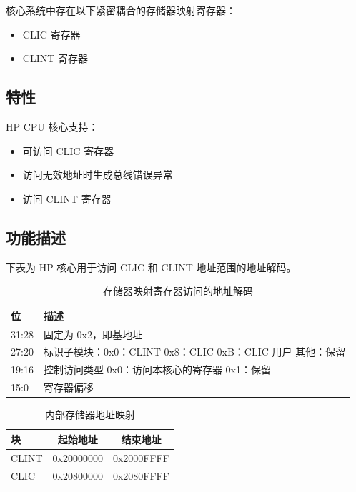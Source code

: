 \documentclass[main\_\_CN.tex]{subfiles}
\begin{document}
核心系统中存在以下紧密耦合的存储器映射寄存器：

\begin{itemize}
    \item CLIC 寄存器
    \item CLINT 寄存器
\end{itemize}

\subsection{特性}
\label{sec:riscvcpu-tcip-features}

HP CPU 核心支持：
\begin{itemize}
    \item 可访问 CLIC 寄存器
    \item 访问无效地址时生成总线错误异常
    \item 访问 CLINT 寄存器
\end{itemize}

\subsection{功能描述}
\label{sec:riscvcpu-tcip-func-descr}

下表为 HP 核心用于访问 CLIC 和 CLINT 地址范围的地址解码。

\begin{longtable}{ | l | p{5 cm} | }
\caption{存储器映射寄存器访问的地址解码} \label{tab:riscvcpu-tcip-table}
\\ \hline
\rowcolor{lightgray}
位 & 描述 \\ \hline
31:28 & 固定为 0x2，即基地址 \\ \hline
27:20 & 标识子模块：\newline 0x0：CLINT \newline 0x8：CLIC \newline 0xB：CLIC 用户 \newline 其他：保留 \\ \hline
19:16 & 控制访问类型 \newline 0x0：访问本核心的寄存器 \newline 0x1：保留\\ \hline
15:0 & 寄存器偏移 \\ \hline
\end{longtable}


\begin{longtable}{ | l | c | c |}
\caption{内部存储器地址映射} \label{tab:riscvcpu-tcip-slave-table}
\\ \hline
\rowcolor{lightgray}
块 & 起始地址 & 结束地址 \\ \hline
CLINT & 0x20000000  &  0x2000FFFF\\ \hline
CLIC & 0x20800000  &  0x2080FFFF\\ \hline

\end{longtable}
\end{document}
